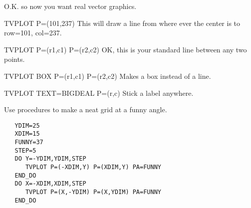 O.K. so now you want real vector graphics.
\begin{example}
  \item[TVPLOT P=(101,237)\hfill]{This will draw a line from where ever
       the center is to row=101, col=237.}
  \item[TVPLOT P=(r1,c1) P=(r2,c2)\hfill]{OK, this is your standard line
       between any two points.}
  \item[TVPLOT BOX P=(r1,c1) P=(r2,c2)\hfill]{Makes a box instead of a line.}
  \item[TVPLOT TEXT=BIGDEAL P=(r,c)\hfill]{Stick a label anywhere.}
\end{example}
Use procedures to make a neat grid at a funny angle.
\begin{verbatim}
   YDIM=25 
   XDIM=15 
   FUNNY=37 
   STEP=5
   DO Y=-YDIM,YDIM,STEP
      TVPLOT P=(-XDIM,Y) P=(XDIM,Y) PA=FUNNY
   END_DO
   DO X=-XDIM,XDIM,STEP
      TVPLOT P=(X,-YDIM) P=(X,YDIM) PA=FUNNY
   END_DO
\end{verbatim}

